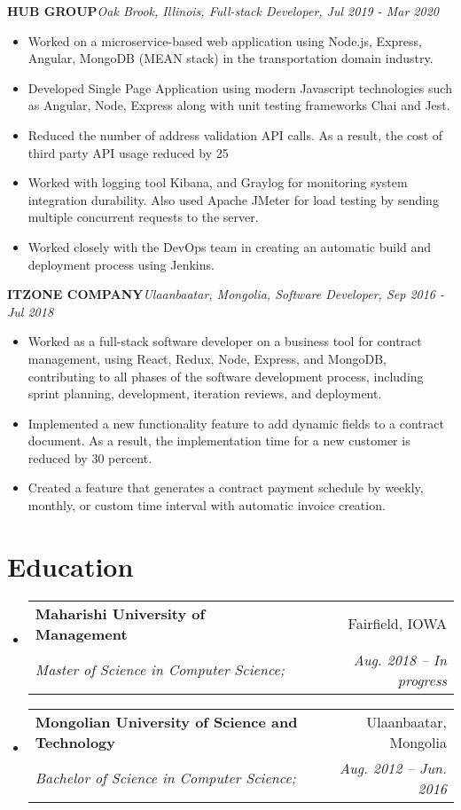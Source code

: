 \documentclass[letterpaper,11pt]{article}
\makeatletter
\newcommand{\resumeSubheading}[4]{
  \vspace{-1pt}\item
    \begin{tabular*}{0.97\textwidth}[t]{l@{\extracolsep{\fill}}r}
      \textbf{#1} & #2 \\
      \textit{\small#3} & \textit{\small #4} \\
    \end{tabular*}\vspace{-5pt}
}
\newcommand{\resumeSubHeadingListStart}{\begin{itemize}[leftmargin=*]}
\newcommand{\resumeSubHeadingListEnd}{\end{itemize}}
\newcommand{\resumeItemListStart}{\begin{itemize}}
\newcommand{\resumeItemListEnd}{\end{itemize}\vspace{-5pt}}
\makeatother
\begin{document}
      \vfill
      \textbf{HUB GROUP}\hfill \textit{Oak Brook, Illinois, Full-stack Developer, Jul 2019 - Mar 2020}
      \resumeItemListStart
        \item{
          Worked on a microservice-based web application using Node.js, Express, Angular, MongoDB (MEAN stack) in the transportation domain industry.
        }
        \item{
          Developed Single Page Application using modern Javascript technologies such as Angular, Node, Express along with unit testing frameworks Chai and Jest. 
        }
        \item{
          Reduced the number of address validation API calls. As a result, the cost of third party API usage reduced by 25%
        }
        \item{
          Worked with logging tool Kibana, and Graylog for monitoring system integration durability. Also used Apache JMeter for load testing by sending multiple concurrent requests to the server.
        }
        \item{
          Worked closely with the DevOps team in creating an automatic build and deployment process using Jenkins. 
        }
      \resumeItemListEnd

      \vfill
      \textbf{ITZONE COMPANY}\hfill \textit{Ulaanbaatar, Mongolia, Software Developer, Sep 2016 - Jul 2018}
      \resumeItemListStart
        \item{
          Worked as a full-stack software developer on a business tool for contract management, using React, Redux, Node, Express, and MongoDB, contributing to all phases of the software development process, including sprint planning, development, iteration reviews, and deployment.
        }
        \item{
          Implemented a new functionality feature to add dynamic fields to a contract document. As a result, the implementation time for a new customer is reduced by 30 percent.
        }
        \item{
          Created a feature that generates a contract payment schedule by weekly, monthly, or custom time interval with automatic invoice creation.
        }
      \resumeItemListEnd
  
\section{Education}
  \resumeSubHeadingListStart
    \resumeSubheading
      {Maharishi University of Management}{Fairfield, IOWA}
      {Master of Science in Computer Science;}{Aug. 2018 -- In progress}
    \resumeSubheading
      {Mongolian University of Science and Technology}{Ulaanbaatar, Mongolia}
      {Bachelor of Science in Computer Science;}{Aug. 2012 -- Jun. 2016}
  \resumeSubHeadingListEnd

\end{document}
